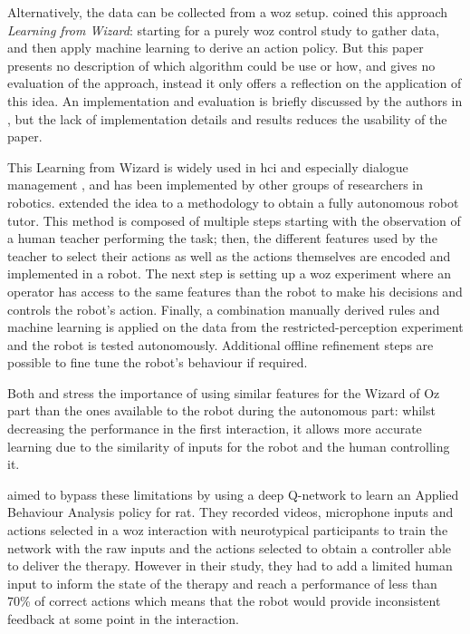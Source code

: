     Alternatively, the data can be collected from a \gls{woz} setup. \cite{knox2014learning} coined this approach \emph{Learning from Wizard}: starting for a purely \gls{woz} control study to gather data, and then apply machine learning to derive an action policy. But this paper presents no description of which algorithm could be use or how, and gives no evaluation of the approach, instead it only offers a reflection on the application of this idea. An implementation and evaluation is briefly discussed by the authors in \cite{knox2016learning}, but the lack of implementation details and results reduces the usability of the paper.
    
    This Learning from Wizard is widely used in \gls{hci} and especially dialogue management \citep{rieser2008learning}, and has been implemented by other groups of researchers in robotics. \citet{sequeira2016discovering} extended the idea to a methodology to obtain a fully autonomous robot tutor. This method is composed of multiple steps starting with the observation of a human teacher performing the task; then, the different features used by the teacher to select their actions as well as the actions themselves are encoded and implemented in a robot. The next step is setting up a \gls{woz} experiment where an operator has access to the same features than the robot to make his decisions and controls the robot's action. Finally, a combination manually derived rules and machine learning is applied on the data from the restricted-perception experiment and the robot is tested autonomously. Additional offline refinement steps are possible to fine tune the robot's behaviour if required. 
    
    Both \citet{knox2014learning} and \citet{sequeira2016discovering} stress the importance of using similar features for the Wizard of Oz part than the ones available to the robot during the autonomous part: whilst decreasing the performance in the first interaction, it allows more accurate learning due to the similarity of inputs for the robot and the human controlling it.
        
    \cite{clark2018deep} aimed to bypass these limitations by using a deep Q-network \citep{mnih2015human} to learn an Applied Behaviour Analysis policy for \gls{rat}. They recorded videos, microphone inputs and actions selected in a \gls{woz} interaction with neurotypical participants to train the network with the raw inputs and the actions selected to obtain a controller able to deliver the therapy. However in their study, they had to add a limited human input to inform the state of the therapy and reach a performance of less than 70\% of correct actions which means that the robot would provide inconsistent feedback at some point in the interaction. 
     
